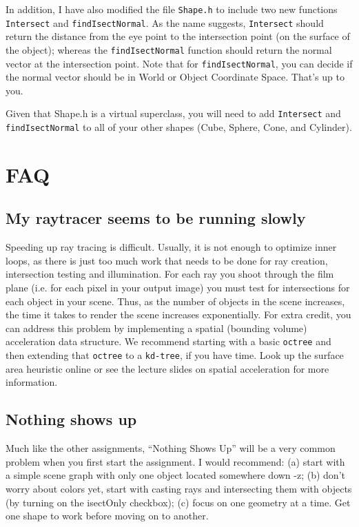 \documentclass[10pt,twocolumn]{article}
\begin{document}
{In addition, I have also modified the file {\tt Shape.h} to include two new functions {\tt Intersect} and {\tt findIsectNormal}. As the name suggests, {\tt Intersect} should return the distance from the eye point to the intersection point (on the surface of the object); whereas the {\tt findIsectNormal} function should return the normal vector at the intersection point. Note that for {\tt findIsectNormal}, you can decide if the normal vector should be in World or Object Coordinate Space. That's up to you.

Given that Shape.h is a virtual superclass, you will need to add {\tt Intersect} and {\tt findIsectNormal} to all of your other shapes (Cube, Sphere, Cone, and Cylinder).

\section{FAQ}
\subsection{My raytracer seems to be running slowly}
Speeding up ray tracing is difficult. Usually, it is not enough to optimize inner loops, as there is just too much work that needs to be done for ray creation, intersection testing and illumination. For each ray you shoot through the film plane (i.e. for each pixel in your output image) you must test for intersections for each object in your scene. Thus, as the number of objects in the scene increases, the time it takes to render the scene increases exponentially. For extra credit, you can address this problem by implementing a spatial (bounding volume) acceleration data structure. We recommend starting with a basic {\tt octree} and then extending that {\tt octree} to a {\tt kd-tree}, if you have time. Look up the surface area heuristic online or see the lecture slides on spatial acceleration for more information.

\subsection{Nothing shows up}
Much like the other assignments, ``Nothing Shows Up'' will be a very common problem when you first start the assignment. I would recommend: (a) start with a simple scene graph with only one object located somewhere down -z; (b) don't worry about colors yet, start with casting rays and intersecting them with objects (by turning on the isectOnly checkbox); (c) focus on one geometry at a time. Get one shape to work before moving on to another.

}
\end{document}
